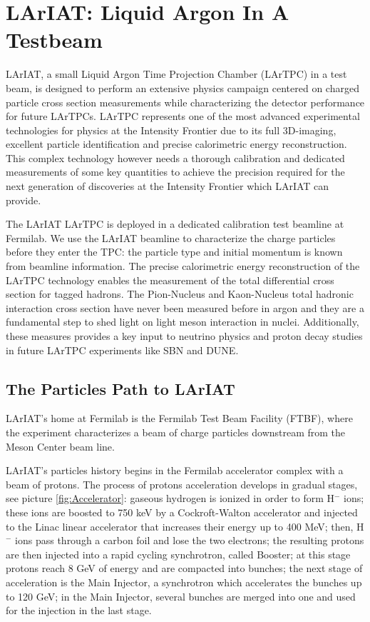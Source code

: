 \chapter{LArIAT: Liquid Argon In A Testbeam}\label{sec:experimentDescription}

LArIAT, a small Liquid Argon Time Projection Chamber (LArTPC) in a test beam,  is designed to perform an extensive physics campaign centered on charged particle cross section measurements while characterizing the detector performance for future LArTPCs. LArTPC represents one of the most advanced experimental technologies for physics at the Intensity Frontier due to its full 3D-imaging, excellent particle identification and precise calorimetric energy reconstruction. This complex technology however needs a thorough calibration and dedicated measurements of some key quantities to achieve the precision required for the next generation of discoveries at the Intensity Frontier which LArIAT can provide. 

The LArIAT LArTPC is deployed in a dedicated calibration test beamline at Fermilab.
We use the LArIAT beamline to characterize the charge particles before they enter the TPC: the particle type and initial momentum is known from beamline information. The precise calorimetric energy reconstruction of the LArTPC technology enables the measurement of the total differential cross section for  tagged hadrons. 
The Pion-Nucleus and Kaon-Nucleus total hadronic interaction cross section have never been measured before in argon and they are a fundamental step to shed light on light meson interaction in nuclei. Additionally, these measures provides a key input to neutrino physics and proton decay studies in future LArTPC experiments like SBN and DUNE.


\section{The Particles Path to LArIAT}

LArIAT's home at Fermilab is the Fermilab Test Beam Facility (FTBF), where the experiment characterizes a beam of charge particles downstream from the Meson Center beam line. 

LArIAT's particles history begins in the Fermilab accelerator complex with a beam of protons. The process of protons acceleration develops in gradual stages, see picture \ref{fig:Accelerator}: gaseous hydrogen is ionized in order to form H$^{-}$ ions; these ions are boosted to 750 keV by a Cockroft-Walton accelerator and injected to the Linac linear accelerator that increases their energy up to 400 MeV; then, H$^{-}$ ions pass through a carbon foil and lose the two electrons; the resulting protons are then injected into a rapid cycling synchrotron, called Booster; at this stage protons reach 8 GeV of energy and are compacted into bunches; the next stage of acceleration is the Main Injector, a synchrotron which accelerates the bunches up to 120 GeV; in the Main Injector, several bunches are merged into one and used for the injection in the last stage.


